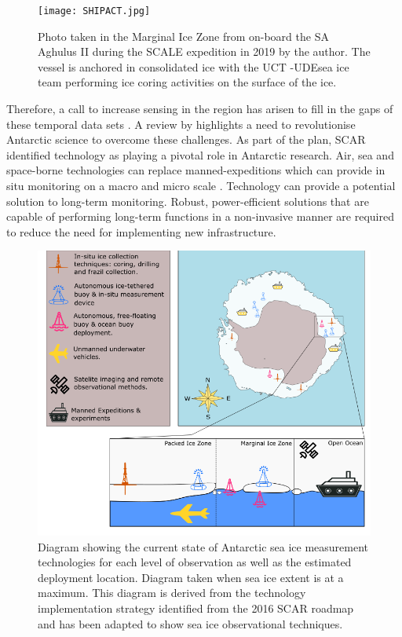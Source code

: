 \begin{figure}[H]
    \centering
    \texttt{[image: SHIPACT.jpg]}
    \caption{Photo taken in the Marginal Ice Zone from on-board the SA Aghulus II during the SCALE expedition in 2019 by the author. The vessel is anchored in consolidated ice with the UCT \protect\footnotemark -UDE\protect\footnotemark sea ice team performing ice coring activities on the surface of the ice.}
    \label{fig:cruise}
\end{figure}

Therefore, a call to increase sensing in the region has arisen to fill in the gaps of these temporal data sets \cite{kennicutt2019sustained}. A review by \textcite{kennicutt2016delivering} highlights a need to revolutionise Antarctic science to overcome these challenges. As part of the plan, SCAR identified technology as playing a pivotal role in Antarctic research. Air, sea and space-borne technologies can replace manned-expeditions which can provide in situ monitoring on a macro and micro scale \cite{kennicutt2016delivering}. Technology can provide a potential solution to long-term monitoring. Robust, power-efficient solutions that are capable of performing long-term functions in a non-invasive manner are required to reduce the need for implementing new infrastructure.\par

\begin{figure}[H]
    \centering
    \includegraphics[scale=0.5]{tech.png}
    \caption{ Diagram showing the current state of Antarctic sea ice measurement technologies for each level of observation as well as the estimated deployment location. Diagram taken when sea ice extent is at a maximum. This diagram is derived from the technology implementation strategy identified from the 2016 SCAR roadmap \cite{kennicutt2019sustained}\protect\footnotemark \space and has been adapted to show sea ice observational techniques. }
    \label{fig:chapter1_tech_diag}
\end{figure}

